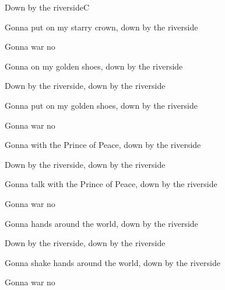 \begin{SBSong}{Down by the riverside}{C}
\begin{SBVerse}
    Gonna put on my starry crown, down by the riverside

    Gonna  war no 
  \end{SBVerse}
  \begin{SBVerse}
    Gonna  on my golden shoes, down by the riverside

    Down by the riverside, down by the riverside
    
    Gonna put on my golden shoes, down by the riverside

    Gonna  war no 
  \end{SBVerse}
  \begin{SBVerse}
    Gonna  with the Prince of Peace, down by the riverside

    Down by the riverside, down by the riverside
    
    Gonna talk with the Prince of Peace, down by the riverside

    Gonna  war no 
  \end{SBVerse}
  \begin{SBVerse}
    Gonna  hands around the world, down by the riverside

    Down by the riverside, down by the riverside
    
    Gonna shake hands around the world, down by the riverside

    Gonna  war no 
  \end{SBVerse}
\end{SBSong}

